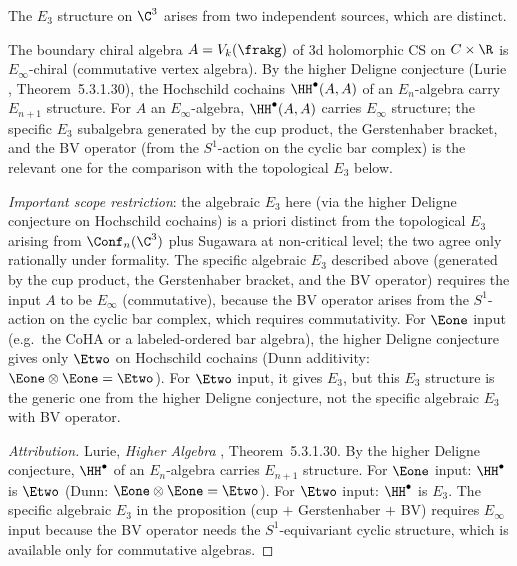 The $E_3$ structure on $\C^3$ arises from two independent sources, which are distinct.

\begin{proposition}
\label{prop:algebraic-e3-deligne}
The boundary chiral algebra $A = V_k(\frakg)$ of 3d holomorphic CS on $C \times \R$ is $E_\infty$-chiral (commutative vertex algebra). By the higher Deligne conjecture (Lurie \cite{LurieHA}, Theorem~5.3.1.30), the Hochschild cochains $\HH^\bullet(A, A)$ of an $E_n$-algebra carry $E_{n+1}$ structure. For $A$ an $E_\infty$-algebra, $\HH^\bullet(A, A)$ carries $E_\infty$ structure; the specific $E_3$ subalgebra generated by the cup product, the Gerstenhaber bracket, and the BV operator (from the $S^1$-action on the cyclic bar complex) is the relevant one for the comparison with the topological $E_3$ below.

\emph{Important scope restriction}: the algebraic $E_3$ here (via the higher Deligne conjecture on Hochschild cochains) is a priori distinct from the topological $E_3$ arising from $\Conf_n(\C^3)$ plus Sugawara at non-critical level; the two agree only rationally under formality. The specific algebraic $E_3$ described above (generated by the cup product, the Gerstenhaber bracket, and the BV operator) requires the input $A$ to be $E_\infty$ (commutative), because the BV operator arises from the $S^1$-action on the cyclic bar complex, which requires commutativity. For $\Eone$ input (e.g.\ the CoHA or a labeled-ordered bar algebra), the higher Deligne conjecture gives only $\Etwo$ on Hochschild cochains (Dunn additivity: $\Eone \otimes \Eone = \Etwo$). For $\Etwo$ input, it gives $E_3$, but this $E_3$ structure is the generic one from the higher Deligne conjecture, not the specific algebraic $E_3$ with BV operator.
\end{proposition}

\begin{proof}[Attribution]
Lurie, \emph{Higher Algebra} \cite{LurieHA}, Theorem~5.3.1.30. By the higher Deligne conjecture, $\HH^\bullet$ of an $E_n$-algebra carries $E_{n+1}$ structure. For $\Eone$ input: $\HH^\bullet$ is $\Etwo$ (Dunn: $\Eone \otimes \Eone = \Etwo$). For $\Etwo$ input: $\HH^\bullet$ is $E_3$. The specific algebraic $E_3$ in the proposition (cup $+$ Gerstenhaber $+$ BV) requires $E_\infty$ input because the BV operator needs the $S^1$-equivariant cyclic structure, which is available only for commutative algebras.
\end{proof}

